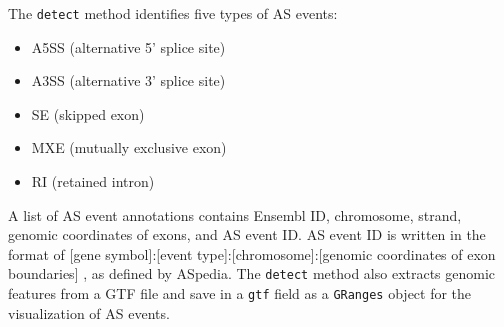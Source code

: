 \documentclass{article}\usepackage[]{graphicx}\usepackage[]{color}
\begin{document}
The \texttt{detect} method identifies five types of AS events:
\begin{itemize}
\item A5SS (alternative 5' splice site)
\item A3SS (alternative 3' splice site)
\item SE (skipped exon)
\item MXE (mutually exclusive exon)
\item RI (retained intron)
\end{itemize}
A list of AS event annotations contains Ensembl ID, chromosome, strand, genomic
coordinates of exons, and AS event ID. AS event ID is written in the format of
[gene symbol]:[event type]:[chromosome]:[genomic coordinates of exon boundaries]
, as defined by ASpedia. The \texttt{detect} method also extracts genomic
features from a GTF file and save in a \texttt{gtf} field as a \texttt{GRanges}
object for the visualization of AS events.
\end{document}

